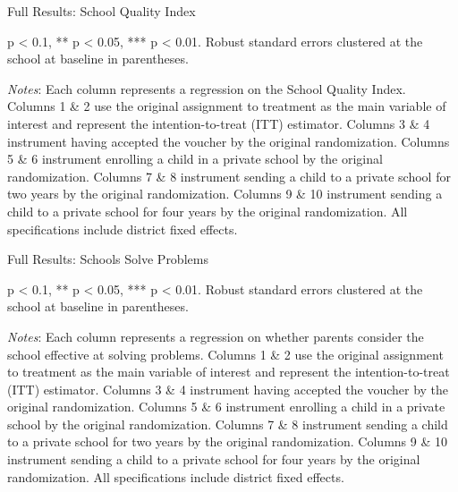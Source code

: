 \documentclass[hidelinks, 12pt, titlepage]{article}
\begin{document}
		\begin{landscape}
			\begin{table}
				\begin{threeparttable}
					\centering
					\caption{Full Results: School Quality Index\label{table:appendixindexquality}}
					
					\begin{tablenotes}
						\item * p < 0.1, ** p < 0.05, *** p < 0.01. Robust standard errors clustered at the school at baseline in parentheses.
						\item \emph{Notes}: Each column represents a regression on the School Quality Index.   Columns 1 \& 2 use the original assignment to treatment as the main variable of interest and represent the intention-to-treat (ITT) estimator.  Columns 3 \& 4 instrument having accepted the voucher by the original randomization.  Columns 5 \& 6 instrument enrolling a child in a private school by the original randomization.  Columns 7 \& 8 instrument sending a child to a private school for two years by the original randomization.  Columns 9 \& 10 instrument sending a child to a private school for four years by the original randomization.  All specifications include district fixed effects.
					\end{tablenotes}
				\end{threeparttable}
			\end{table}
		\end{landscape}
	\clearpage

		\begin{landscape}
			\begin{table}
				\begin{threeparttable}
					\centering
					\caption{Full Results: Schools Solve Problems\label{table:appendixschoolproblemsolve}}
					
					\begin{tablenotes}
						\item * p < 0.1, ** p < 0.05, *** p < 0.01. Robust standard errors clustered at the school at baseline in parentheses.
						\item \emph{Notes}: Each column represents a regression on whether parents consider the school effective at solving problems.   Columns 1 \& 2 use the original assignment to treatment as the main variable of interest and represent the intention-to-treat (ITT) estimator.  Columns 3 \& 4 instrument having accepted the voucher by the original randomization.  Columns 5 \& 6 instrument enrolling a child in a private school by the original randomization.  Columns 7 \& 8 instrument sending a child to a private school for two years by the original randomization.  Columns 9 \& 10 instrument sending a child to a private school for four years by the original randomization.  All specifications include district fixed effects.
					\end{tablenotes}
				\end{threeparttable}
			\end{table}
		\end{landscape}
	\clearpage
\end{document}
